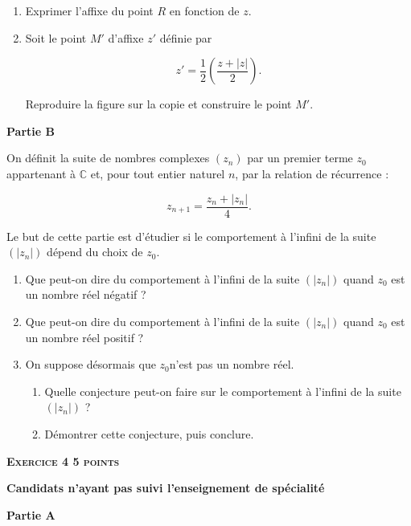 \documentclass[10pt]{article}
\newcommand{\C}{\mathbb{C}}
\begin{document}
\begin{enumerate}
\item Exprimer l'affixe du point $R$ en fonction de $z$.
\item Soit le point $M'$ d'affixe $z'$ définie par

\[z' = \dfrac{1}{2}\left(\dfrac{z + |z|}{2}\right) .\]

Reproduire la figure sur la copie et construire le point $M'$.
\end{enumerate}

\bigskip

\textbf{Partie B}

\medskip

On définit la suite de nombres complexes $\left(z_n\right)$ par un premier terme $z_0$ appartenant à $\C$ et, pour tout entier naturel $n$, par la relation de récurrence :

\[z_{n + 1} = \dfrac{z_n + \left|z_n \right|}{4}.\]

Le but de cette partie est d'étudier si le comportement à l'infini de la suite $\left(\left|z_n\right|\right)$ dépend du choix de $z_0$.

\medskip

\begin{enumerate}
\item Que peut-on dire du comportement à l'infini de la suite $\left(\left|z_n\right|\right)$ quand $z_0$ est un nombre réel négatif ?
\item Que peut-on dire du comportement à l'infini de la suite $\left(\left|z_n\right|\right)$ quand $z_0$ est un nombre réel positif ?
\item On suppose désormais que $z_0 $n'est pas un nombre réel.
	\begin{enumerate}
		\item Quelle conjecture peut-on faire sur le comportement à l'infini de la suite $\left(\left|z_n\right|\right)$ ?
		\item Démontrer cette conjecture, puis conclure.
	\end{enumerate} 
\end{enumerate}

\vspace{0,5cm}

\textbf{\textsc{Exercice 4 \hfill 5 points}}

\textbf{Candidats n'ayant pas suivi l'enseignement de spécialité} 

\medskip

\textbf{Partie A}
\end{document}
